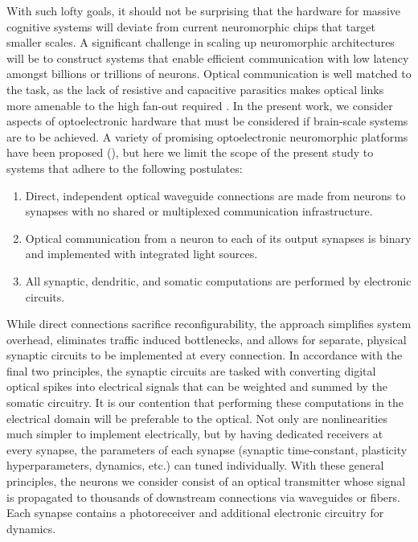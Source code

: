 \documentclass[conference]{IEEEtran}
\begin{document}
With such lofty goals, it should not be surprising that the hardware for massive cognitive systems will deviate from current neuromorphic chips that target smaller scales. A significant challenge in scaling up neuromorphic architectures will be to construct systems that enable efficient communication with low latency amongst billions or trillions of neurons. Optical communication is well matched to the task, as the lack of resistive and capacitive parasitics makes optical links more amenable to the high fan-out required \cite{shainline2018largest}. In the present work, we consider aspects of optoelectronic hardware that must be considered if brain-scale systems are to be achieved. A variety of promising optoelectronic neuromorphic platforms have been proposed (\cite{shainline2019superconducting, nazirzadeh2018energy}), but here we limit the scope of the present study to systems that adhere to the following postulates:

\begin{enumerate}
    \item Direct, independent optical waveguide connections are made from neurons to synapses with no shared or multiplexed communication infrastructure.
    \item Optical communication from a neuron to each of its output synapses is binary and implemented with integrated light sources. 
    \item All synaptic, dendritic, and somatic computations are performed by electronic circuits.
\end{enumerate}

While direct connections sacrifice reconfigurability, the approach simplifies system overhead, eliminates traffic induced bottlenecks, and allows for separate, physical synaptic circuits to be implemented at every connection. In accordance with the final two principles, the synaptic circuits are tasked with converting digital optical spikes into electrical signals that can be weighted and summed by the somatic circuitry. It is our contention that performing these computations in the electrical domain will be preferable to the optical. Not only are nonlinearities much simpler to implement electrically, but by having dedicated receivers at every synapse, the parameters of each synapse (synaptic time-constant, plasticity hyperparameters, dynamics, etc.) can tuned individually. With these general principles, the neurons we consider consist of an optical transmitter whose signal is propagated to thousands of downstream connections via waveguides or fibers. Each synapse contains a photoreceiver and additional electronic circuitry for dynamics. 
\end{document}
